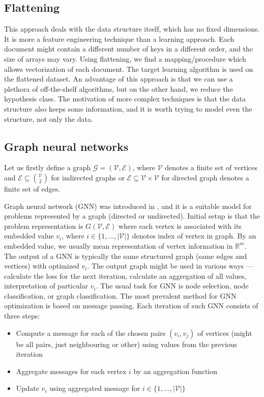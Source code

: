 \subsection{Flattening}
This approach deals with the data structure itself, which has no fixed dimensions. It is more a feature engineering technique than a learning approach. Each document might contain a different number of keys in a different order, and the size of arrays may vary. Using flattening, we find a mapping/procedure which allows vectorization of each document. The target learning algorithm is used on the flattened dataset. An advantage of this approach is that we can use a plethora of off-the-shelf algorithms, but on the other hand, we reduce the hypothesis class.
\hfill \break
The motivation of more complex techniques is that the data structure also keeps some information, and it is worth trying to model even the structure, not only the data.

\subsection{Graph neural networks}
Let us firstly define a graph $\mathcal{G}=(\mathcal{V},\mathcal{E})$, where $\mathcal{V}$ denotes a finite set of vertices and $\mathcal{E}\subseteq\binom{\mathcal{V}}{2}$ for indirected graphs or $\mathcal{E}\subseteq\mathcal{V}\times\mathcal{V}$ for directed graph denotes a finite set of edges. 

Graph neural network (GNN) was introduced in \cite{Scarselli2009}, and it is a suitable model for problems represented by a graph (directed or undirected). Initial setup is that the problem representation is $G(\mathcal{V},\mathcal{E})$ where each vertex is associated with its embedded value $v_i$, where $i\in\{1,\dots,|\mathcal{V}|\}$ denotes index of vertex in graph. By an embedded value, we usually mean representation of vertex information in $\mathbb{R}^m$. The output of a GNN is typically the same structured graph (same edges and vertices) with optimized $v_i$. The output graph might be used in various ways --- calculate the loss for the next iteration, calculate an aggregation of all values, interpretation of particular $v_i$. The usual task for GNN is node selection, node classification, or graph classification. The most prevalent method for GNN optimization is based on message passing. Each iteration of such GNN consists of three steps:
\begin{itemize}
    \itemsep0em
    \item Compute a message for each of the chosen pairs $(v_i,v_j)$ of vertices (might be all pairs, just neighbouring or other) using values from the previous iteration
    \item Aggregate messages for each vertex $i$ by an aggregation function
    \item Update $v_i$ using aggregated message for $i\in\{1,\dots,|\mathcal{V}|\}$
\end{itemize}

